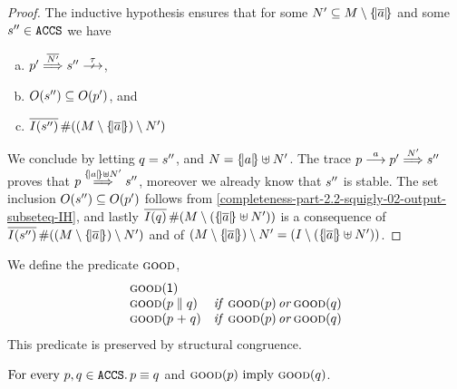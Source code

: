 \begin{proof}
    The inductive hypothesis ensures that for some $N' \subseteq M
    \setminus \{\!|\overline{a}|\!\}$ and some $s'' \in \texttt{ACCS}$
    we have
    \begin{enumerate}[(a)]
    \item $p' \wt{ \co{N'} } \stateC  \stable$,
    \item\label{completeness-part-2.2-squigly-02-output-subseteq-IH}
      $O(s'') \subseteq O(p')$, and
    \item\label{completeness-part-2.2-squigly-02-input-subseteq-IH}
      $\overline{ I(s'') } \mathop{\#} ((M \setminus \{\!| \overline{a} |\!\})
      \setminus N')$
    \end{enumerate}
    We conclude by letting $ q = s''$, and $N = \{\!|a|\!\} \uplus N'$.
    The trace $p \mathrel{\overset{a}\longrightarrow} p' \mathrel{\overset{ N' } \Longrightarrow} s''$ proves that $p \mathrel{\overset{
      \{\!|a|\!\} \uplus N' } \Longrightarrow} s''$,
    moreover we already know that $s''$ is stable.
    The set inclusion $O(s'') \subseteq O( p' )$ follows from
    \ref{completeness-part-2.2-squigly-02-output-subseteq-IH},
    and lastly $\overline{I(q)} \mathop{\#} (M \setminus
      (\{\!|\overline{a}|\!\} \uplus N'))$ is a consequence of
    $\overline{ I(s'') } \mathop{\#} ((M \setminus \{\!| \overline{a} |\!\})
      \setminus N')$ and of
    $ (M \setminus \{\!|\overline{a}|\!\}) \setminus N' = (I \setminus
    (\{\!|\overline{a}|\!\} \uplus N'))$.
\end{proof}



We define the predicate $\textsc{good}$,%
 $$
 \begin{array}{lll}
   \textsc{good}(\mathop{\textsf{1}}) \\
   \textsc{good}(p \mathrel{\parallel} q)  &\mathit{if}\ \textsc{good}(p)\, \mathit{or}\, \textsc{good}(q)\\
   \textsc{good}(p \mathrel{+} q) &\mathit{if}\ \textsc{good}(p)\, \mathit{or}\, \textsc{good}(q)\\
 \end{array}
 $$
 \noindent
 This predicate is preserved by structural congruence.
 \begin{lemma}%
  \label{lem:happy-sc}
  $\text{For every } p, q \in \texttt{ACCS} . \, p \equiv q$ and $\textsc{good}(p) \text{ imply } \textsc{good}(q)$.
\end{lemma}




